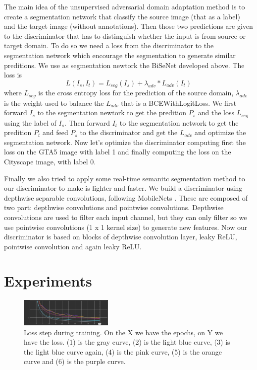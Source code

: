 \documentclass[conference]{IEEEtran}
\begin{document}
The main idea of the unsupervised adversarial domain adaptation method \cite{b3} is to create a segmentation network that classify the source
image (that as a label) and the target image (without annotations). Then those two predictions are given to the discriminator that
has to distinguish whether the input is from source or target domain. To do so we need a loss from the discriminator to the 
segmentation network which encourage the segmentation to generate similar preditions. We use as segmentation newtork the BiSeNet 
developed above. The loss is 
\[L(I_s,I_t) = L_{seg}(I_s) + \lambda_{adv}*L_{adv}(I_t)\]
where \(L_{seg}\) is the cross entropy loss for the prediction of the source domain, \(\lambda_{adv}\) is the weight used to 
balance the \(L_{adv}\) that is a BCEWithLogitLoss.
We first forward \(I_s\) to the segmentation newtork to get the predition \(P_s\) and the loss \(L_{seg}\) using the label of \(I_s\).
Then forward \(I_t\) to the segmentation network to get the predition \(P_t\) and feed \(P_s\) to the discriminator and get the 
\(L_{adv}\) and optimize the segmentation network. Now let's optimize the discriminator computing first the loss on the GTA5 image
with label 1 and finally computing the loss on the Cityscape image, with label 0. 

Finally we also tried to apply some real-time semanitc segmentation method to our discriminator to make is lighter and faster.
We build a discriminator using depthwise separable convolutions, following MobileNets \cite{b6}. These are composed of two part: 
depthwise convolutions and pointwise convolutions. Depthwise convolutions are used to filter each input channel, but they can
only filter so we use pointwise convolutions (1 x 1 kernel size) to generate new features. Now our discriminator is based on blocks of
depthwise convolution layer, leaky ReLU, pointwise convolution and again leaky ReLU. 

\section{Experiments}

\begin{figure}[tp]
\centerline{\includegraphics[width=0.4\textwidth]{figures/loss.png}}
\caption{Loss step during training. On the X we have the epochs, on Y we have the loss. (1) is the gray curve, (2) is the light blue
curve, (3) is the light blue curve again, (4) is the pink curve, (5) is the orange curve and (6) is the purple curve.}
\label{loss_steps}
\end{figure}
\end{document}
